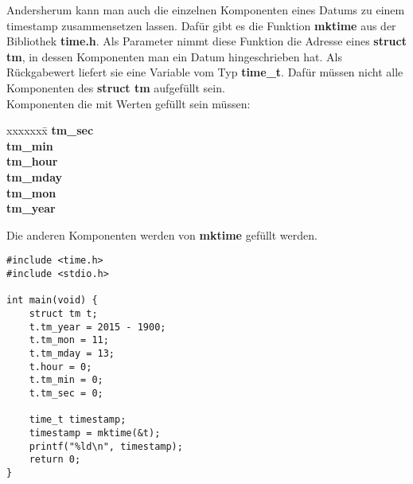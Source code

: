 \documentclass[c_worksheet.tex]{subfiles}
\begin{document}
Andersherum kann man auch die einzelnen Komponenten eines Datums zu einem timestamp zusammensetzen lassen. Dafür gibt es die Funktion \textbf{mktime} aus der Bibliothek \textbf{time.h}. Als Parameter nimmt diese Funktion die Adresse eines \textbf{struct tm}, in dessen Komponenten man ein Datum hingeschrieben hat. Als Rückgabewert liefert sie eine Variable vom Typ \textbf{time\_t}. Dafür müssen nicht alle Komponenten des \textbf{struct tm} aufgefüllt sein.\\

Komponenten die mit Werten gefüllt sein müssen:

\begin{tabbing}
xxxxxxx\= \kill
\>\textbf{tm\_sec}\\
\>\textbf{tm\_min}\\
\>\textbf{tm\_hour}\\
\>\textbf{tm\_mday}\\
\>\textbf{tm\_mon}\\
\>\textbf{tm\_year}
\end{tabbing}

Die anderen Komponenten werden von \textbf{mktime} gefüllt werden.

\begin{lstlisting}
#include <time.h>
#include <stdio.h>

int main(void) {
    struct tm t;
    t.tm_year = 2015 - 1900;
    t.tm_mon = 11;
    t.tm_mday = 13;
    t.hour = 0;
    t.tm_min = 0;
    t.tm_sec = 0;

    time_t timestamp;
    timestamp = mktime(&t);
    printf("%ld\n", timestamp);
    return 0;
}
\end{lstlisting}
\end{document}
